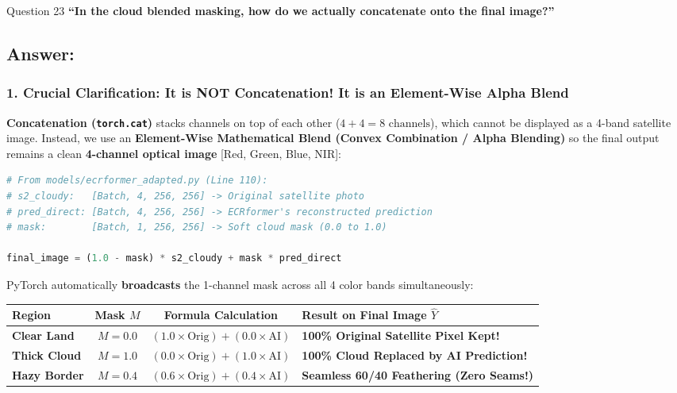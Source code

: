 \documentclass[11pt,a4paper]{article}
\begin{document}
\begin{questionbox}{Question 23}
\textbf{``In the cloud blended masking, how do we actually concatenate onto the final image?''}
\end{questionbox}

\subsection*{Answer:}
\subsubsection*{1. Crucial Clarification: It is NOT Concatenation! It is an Element-Wise Alpha Blend}
\textbf{Concatenation (\texttt{torch.cat})} stacks channels on top of each other ($4 + 4 = 8\text{ channels}$), which cannot be displayed as a 4-band satellite image. Instead, we use an \textbf{Element-Wise Mathematical Blend (Convex Combination / Alpha Blending)} so the final output remains a clean \textbf{4-channel optical image} [Red, Green, Blue, NIR]:

\begin{lstlisting}[language=Python]
# From models/ecrformer_adapted.py (Line 110):
# s2_cloudy:   [Batch, 4, 256, 256] -> Original satellite photo
# pred_direct: [Batch, 4, 256, 256] -> ECRformer's reconstructed prediction
# mask:        [Batch, 1, 256, 256] -> Soft cloud mask (0.0 to 1.0)

final_image = (1.0 - mask) * s2_cloudy + mask * pred_direct
\end{lstlisting}

PyTorch automatically \textbf{broadcasts} the 1-channel mask across all 4 color bands simultaneously:

\begin{center}
\begin{tabularx}{\textwidth}{lccX}
\toprule
\textbf{Region} & \textbf{Mask $M$} & \textbf{Formula Calculation} & \textbf{Result on Final Image $\hat{Y}$} \\
\midrule
\textbf{Clear Land} & $M = 0.0$ & $(1.0 \times \text{Orig}) + (0.0 \times \text{AI})$ & \textbf{100\% Original Satellite Pixel Kept!} \\
\textbf{Thick Cloud} & $M = 1.0$ & $(0.0 \times \text{Orig}) + (1.0 \times \text{AI})$ & \textbf{100\% Cloud Replaced by AI Prediction!} \\
\textbf{Hazy Border} & $M = 0.4$ & $(0.6 \times \text{Orig}) + (0.4 \times \text{AI})$ & \textbf{Seamless 60/40 Feathering (Zero Seams!)} \\
\bottomrule
\end{tabularx}
\end{center}
\end{document}
